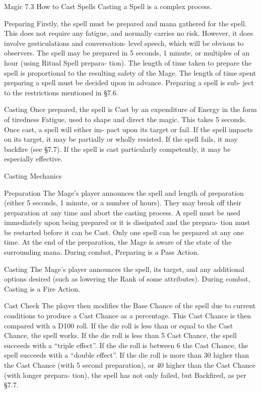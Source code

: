 \begin{Chapter}{Magic}
7.3 How to Cast Spells 
Casting a Spell is a complex process. 

Preparing  Firstly,  the  spell  must  be  prepared  and 
mana  gathered  for  the  spell.  This  does  not  require 
any fatigue, and normally carries no risk. However, 
it  does  involve  gesticulations  and  conversation-
level  speech,  which  will  be  obvious  to  observers. 
The spell may be prepared in 5 seconds, 1 minute, 
or multiples of an hour (using Ritual Spell prepara-
tion). The length of time taken to prepare the spell 
is proportional to the resulting safety of the Mage. 
The length of time spent preparing a spell must be 
decided upon in advance.  Preparing a spell is sub-
ject to the restrictions mentioned in §7.6. 

Casting  Once  prepared,  the  spell  is  Cast  by  an 
expenditure  of  Energy  in  the  form  of  tiredness 
Fatigue,  used  to  shape  and  direct  the  magic.  This 
takes  5  seconds.  Once  cast,  a  spell  will  either  im-
pact  upon its  target  or  fail.  If  the  spell  impacts  on 
its target, it may  be  partially  or  wholly  resisted.  If 
the  spell  fails,  it  may  backfire  (see  §7.7).  If  the 
spell  is  cast  particularly  competently,  it  may  be 
especially effective. 

Casting Mechanics 

Preparation  The  Mage’s  player  announces  the 
spell and length of preparation (either 5 seconds, 1 
minute, or a number of hours). They may break off 
their  preparation  at  any  time  and  abort  the  casting 
process.  A  spell  must  be  used  immediately  upon 
being  prepared  or  it  is  dissipated  and  the  prepara-
tion  must  be  restarted  before  it  can  be  Cast.  Only 
one  spell  can  be  prepared  at  any  one  time.  At  the 
end  of  the  preparation,  the  Mage  is  aware  of  the 
state  of  the  surrounding  mana.  During  combat, 
Preparing is a Pass Action. 

Casting The Mage’s player announces the spell, its 
target,  and any  additional  options  desired  (such  as 
lowering  the  Rank  of  some  attributes).  During 
combat, Casting is a Fire Action. 

Cast  Check  The  player  then  modifies  the  Base 
Chance  of  the  spell  due  to  current  conditions  to 
produce  a  Cast  Chance  as  a  percentage.  This  Cast 
Chance  is  then  compared  with  a  D100  roll.  If  the 
die roll is less than or equal to the Cast Chance, the 
spell  works.  If  the  die  roll  is  less  than  5%
Cast  Chance,  the  spell  succeeds  with  a  “triple 
effect”.  If  the  die  roll  is  between  6%
the Cast Chance, the spell succeeds with a “double 
effect”.  If  the  die  roll  is  more  than 30  higher  than 
the Cast Chance (with 5 second preparation), or 40 
higher  than the  Cast  Chance  (with  longer  prepara-
tion),  the  spell  has  not  only  failed,  but  Backfired, 
as per §7.7. 


\end{Chapter}
